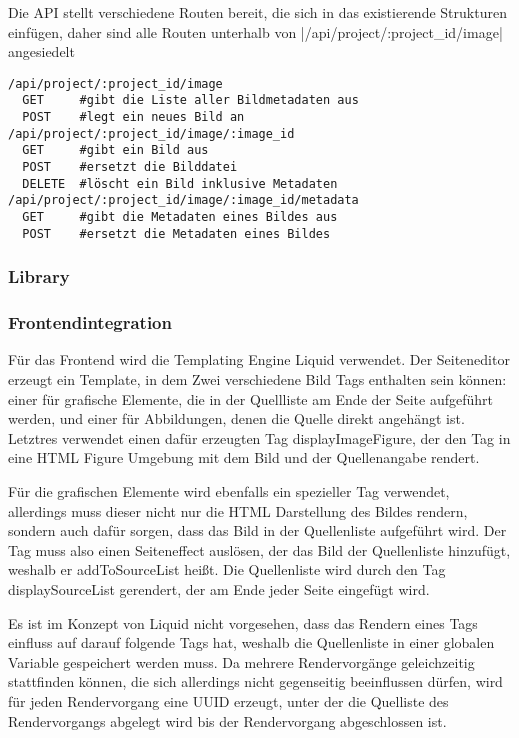 Die API stellt verschiedene Routen bereit, die sich in das existierende
Strukturen einfügen, daher sind alle Routen unterhalb von
|/api/project/:project_id/image| angesiedelt

\begin{verbatim}
/api/project/:project_id/image
  GET     #gibt die Liste aller Bildmetadaten aus
  POST    #legt ein neues Bild an
/api/project/:project_id/image/:image_id
  GET     #gibt ein Bild aus
  POST    #ersetzt die Bilddatei
  DELETE  #löscht ein Bild inklusive Metadaten
/api/project/:project_id/image/:image_id/metadata
  GET     #gibt die Metadaten eines Bildes aus
  POST    #ersetzt die Metadaten eines Bildes
\end{verbatim}

\subsubsection{Library}



\subsubsection{Frontendintegration}

Für das Frontend wird die Templating Engine Liquid verwendet. Der Seiteneditor
erzeugt ein Template, in dem Zwei verschiedene Bild Tags enthalten sein können:
einer für grafische Elemente, die in der Quellliste am Ende der Seite aufgeführt
werden, und einer für Abbildungen, denen die Quelle direkt angehängt ist.
Letztres verwendet einen dafür erzeugten Tag displayImageFigure, der den Tag in
eine HTML Figure Umgebung mit dem Bild und der Quellenangabe rendert.

Für die grafischen Elemente wird ebenfalls ein spezieller Tag verwendet,
allerdings muss dieser nicht nur die HTML Darstellung des Bildes rendern,
sondern auch dafür sorgen, dass das Bild in der Quellenliste aufgeführt wird.
Der Tag muss also einen Seiteneffect auslösen, der das Bild der Quellenliste
hinzufügt, weshalb er addToSourceList heißt. Die Quellenliste wird durch den Tag
displaySourceList gerendert, der am Ende jeder Seite eingefügt wird.

Es ist im Konzept von Liquid nicht vorgesehen, dass das Rendern eines Tags
einfluss auf darauf folgende Tags hat, weshalb die Quellenliste in einer
globalen Variable gespeichert werden muss. Da mehrere Rendervorgänge
geleichzeitig stattfinden können, die sich allerdings nicht gegenseitig
beeinflussen dürfen, wird für jeden Rendervorgang eine UUID erzeugt, unter der
die Quelliste des Rendervorgangs abgelegt wird bis der Rendervorgang
abgeschlossen ist.

